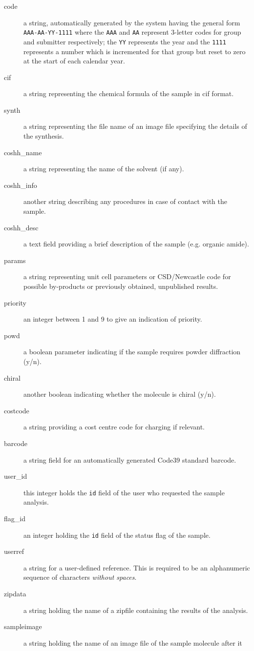 \documentclass[12pt,twoside]{article}
\begin{document}
\begin{description}
\item[code]
a string, automatically generated by the system having the
general form \verb=AAA-AA-YY-1111= where the \verb=AAA= and \verb=AA= 
represent 3-letter codes for group and submitter respectively; 
the \verb=YY= represents the year and the \verb=1111= represents a number 
which is incremented for that group but reset to zero at the start of each 
calendar year.
\item[cif]
a string representing the chemical formula of the sample in cif format.
\item[synth]
a string representing the file name of an image file specifying the details
of the synthesis.
\item[coshh\_name]
a string representing the name of the solvent (if any).
\item[coshh\_info]
another string describing any procedures in case of contact with the sample.
\item[coshh\_desc]
a text field providing a brief description of the sample (e.g. organic amide).
\item[params]
a string representing unit cell parameters
or CSD/Newcastle code for possible by-products or previously obtained, 
unpublished results.
\item[priority]
an integer between 1 and 9 to give an indication of priority.
\item[powd]
a boolean parameter indicating if the sample requires powder diffraction (y/n).
\item[chiral]
another boolean indicating whether the molecule is chiral (y/n).
\item[costcode]
a string providing a cost centre code for charging if relevant.
\item[barcode]
a string field for an automatically generated Code39 standard barcode.
\item[user\_id]
this integer holds the \verb=id= field of the user who requested the
sample analysis.
\item[flag\_id]
an integer holding the \verb=id= field of the status flag of the sample.
\item[userref]
a string for a user-defined reference. This is required to be an
alphanumeric sequence of characters \emph{without spaces}.
\item[zipdata]
a string holding the name of a zipfile containing the results of the analysis.
\item[sampleimage]
a string holding the name of an image file of the sample molecule after it

\end{description}
\end{document}
